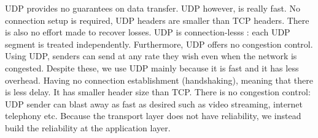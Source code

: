 \documentclass[a4paper]{article}
\theoremstyle{plain}
\theoremstyle{definition}
\newtheorem{defn}{Definition}[section]
\theoremstyle{remark}
\begin{document}
\begin{tcolorbox}[colback=black!3!white,colframe=black!60!white,title=\begin{defn}User Datagram Protocol (UDP) \label{User Datagram Protocol (UDP)}\end{defn}]
UDP provides no guarantees on data transfer. UDP however, is really fast. No connection setup is required, UDP headers are smaller than TCP headers. There is also no effort made to recover losses. UDP is connection-lesss : each UDP segment is treated independently. Furthermore, UDP offers no congestion control. Using UDP, senders can send at any rate they wish even when the network is congested. Despite these, we use UDP mainly because it is fast and it has less overhead. Having no connection establishment (handshaking), meaning that there is less delay. It has smaller header size than TCP. There is no congestion control: UDP sender can blast away as fast as desired such as video streaming, internet telephony etc. Because the transport layer does not have reliability, we instead build the reliability at the application layer. 
\end{tcolorbox}
\end{document}
